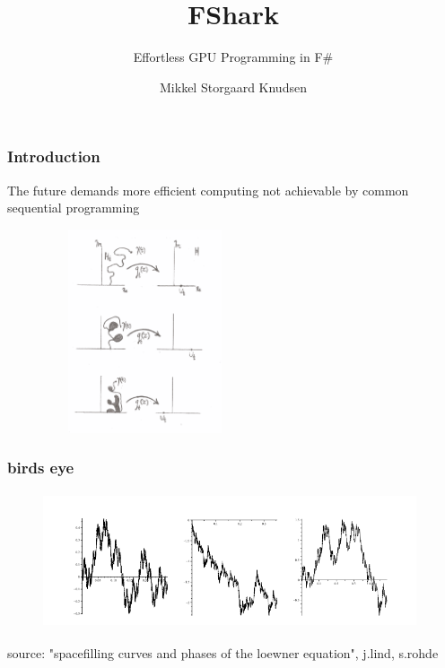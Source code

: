\documentclass[10pt, compress]{beamer}
\title{FShark}
\subtitle{Effortless GPU Programming in F\#}
\author{Mikkel Storgaard Knudsen}
\institute{Master's Thesis presentation, University of Copenhagen}
\begin{document}
\maketitle

\begin{frame}[fragile]
\frametitle{Introduction}
The future demands more efficient computing
\pause 
not achievable by common sequential programming 




\begin{figure}
  \centering
 \includegraphics[width=6cm,height=6cm]{firstex.png}
\end{figure}

\end{frame}

\begin{frame}[fragile]
  \frametitle{birds eye}
  


  

\begin{figure}
  \centering
 \includegraphics[width=11cm,height=4cm]{intro2.png}
\end{figure}
\tiny
source: "spacefilling curves and phases of the loewner equation", j.lind, s.rohde
\normalsize
\end{frame}
\end{document}
